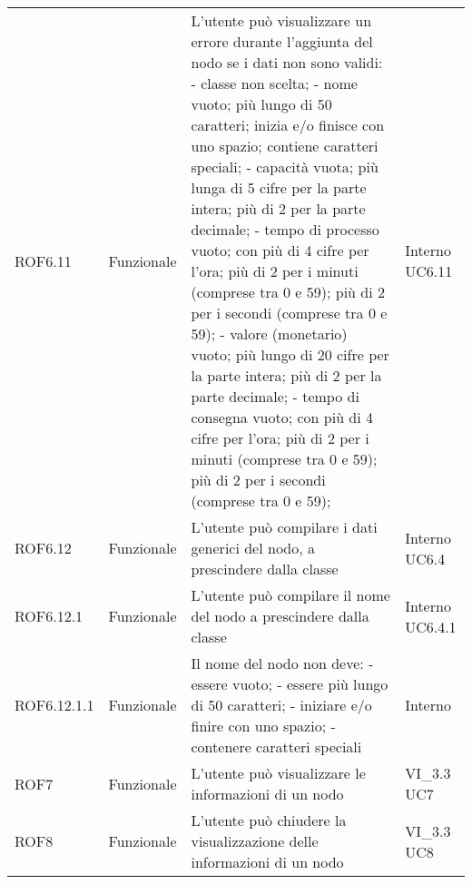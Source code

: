 \begin{longtable}{p{2cm}!{\VRule[1pt]}p{2cm}!{\VRule[1pt]}p{5cm}!{\VRule[1pt]}p{1.5cm}}
	\\
	ROF6.11&Funzionale\newline  & L'utente può visualizzare un errore durante l'aggiunta del nodo se i dati non sono validi:
	- classe non scelta;
	- nome vuoto; più lungo di 50 caratteri; inizia e/o finisce con uno spazio; contiene caratteri speciali;
	- capacità vuota; più lunga di 5 cifre per la parte intera; più di 2 per la parte decimale;
	- tempo di processo vuoto; con più di 4 cifre per l'ora; più di 2 per i minuti (comprese tra 0 e 59); più di 2 per i secondi (comprese tra 0 e 59);
	- valore (monetario) vuoto; più lungo di 20 cifre per la parte intera; più di 2 per la parte decimale;
	- tempo di consegna vuoto; con più di 4 cifre per l'ora; più di 2 per i minuti (comprese tra 0 e 59); più di 2 per i secondi (comprese tra 0 e 59); & Interno \newline UC6.11
	\\
	ROF6.12                          & Funzionale\newline               & L'utente può compilare i dati generici del nodo, a prescindere dalla classe                                              & Interno \newline UC6.4       
	\\
	ROF6.12.1                        & Funzionale\newline               & L'utente può compilare il nome del nodo a prescindere dalla classe                                                       & Interno \newline UC6.4.1     
	\\
	ROF6.12.1.1&Funzionale\newline  & Il nome del nodo non deve:
	- essere vuoto;
	- essere più lungo di 50 caratteri;
	- iniziare e/o finire con uno spazio;
	- contenere caratteri speciali & Interno \\
	ROF7                             & Funzionale\newline               & L'utente può visualizzare le informazioni di un nodo                                                                     & VI_3.3 \newline UC7          
	\\
	ROF8                             & Funzionale\newline               & L'utente può chiudere la visualizzazione delle informazioni di un nodo                                                   & VI_3.3 \newline UC8          
	\\

\end{longtable}
